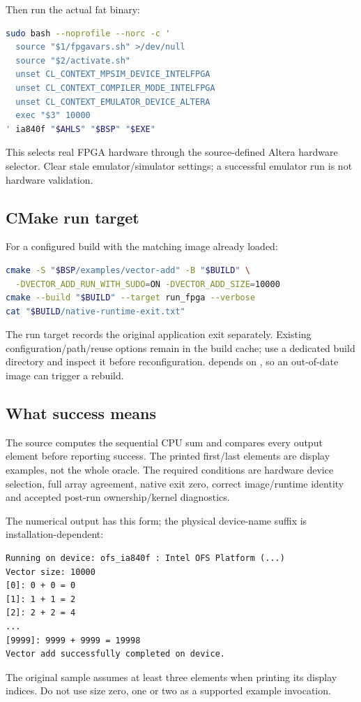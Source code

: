 \documentclass[11pt,letterpaper]{article}
\newcommand{\code}[1]{{\ttfamily\expandafter\seqsplit\expandafter{\detokenize{#1}}}}
\newcommand{\src}[1]{\cite{S#1}}
\begin{document}
Then run the actual fat binary:
\begin{lstlisting}[language=bash]
sudo bash --noprofile --norc -c '
  source "$1/fpgavars.sh" >/dev/null
  source "$2/activate.sh"
  unset CL_CONTEXT_MPSIM_DEVICE_INTELFPGA
  unset CL_CONTEXT_COMPILER_MODE_INTELFPGA
  unset CL_CONTEXT_EMULATOR_DEVICE_ALTERA
  exec "$3" 10000
' ia840f "$AHLS" "$BSP" "$EXE"
\end{lstlisting}
This selects real FPGA hardware through the source-defined Altera hardware
selector. Clear stale emulator/simulator settings; a successful emulator run
is not hardware validation.

\subsection{CMake run target}
For a configured build with the matching image already loaded:
\begin{lstlisting}[language=bash]
cmake -S "$BSP/examples/vector-add" -B "$BUILD" \
  -DVECTOR_ADD_RUN_WITH_SUDO=ON -DVECTOR_ADD_SIZE=10000
cmake --build "$BUILD" --target run_fpga --verbose
cat "$BUILD/native-runtime-exit.txt"
\end{lstlisting}
The run target records the original application exit separately. Existing
configuration/path/reuse options remain in the build cache; use a dedicated
build directory and inspect it before reconfiguration. \code{run_fpga} depends
on \code{fpga}, so an out-of-date image can trigger a rebuild.

\subsection{What success means}
The source computes the sequential CPU sum and compares every output element
before reporting success. The printed first/last elements are display examples,
not the whole oracle. The required conditions are hardware device selection,
full array agreement, native exit zero, correct image/runtime identity and
accepted post-run ownership/kernel diagnostics.\src{11}

The numerical output has this form; the physical device-name suffix is
installation-dependent:
\begin{lstlisting}
Running on device: ofs_ia840f : Intel OFS Platform (...)
Vector size: 10000
[0]: 0 + 0 = 0
[1]: 1 + 1 = 2
[2]: 2 + 2 = 4
...
[9999]: 9999 + 9999 = 19998
Vector add successfully completed on device.
\end{lstlisting}
The original sample assumes at least three elements when printing its display
indices. Do not use size zero, one or two as a supported example invocation.
\end{document}
